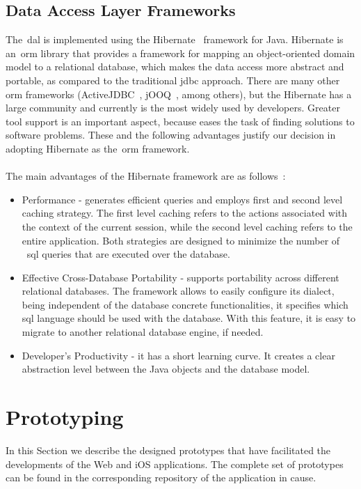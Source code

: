 \subsection{Data Access Layer Frameworks}
The~\gls{dal} is implemented using the Hibernate~\cite{hibernate} framework for Java. Hibernate is an~\gls{orm} library that provides a framework for mapping an object-oriented domain model to a relational database, which makes the data access more abstract and portable, as compared to the traditional \gls{jdbc} approach. There are many other \gls{orm} frameworks (ActiveJDBC~\cite{activeJDBC}, jOOQ~\cite{jooq}, among others), but the Hibernate has a large community and currently is the most widely used by developers. Greater tool support is an important aspect, because eases the task of finding solutions to software problems. These and the following advantages justify our decision in adopting Hibernate as the~\gls{orm} framework.\\
\\
The main advantages of the Hibernate framework are as follows~\cite{hibernateBenefits}:
\begin{itemize}
\item Performance - generates efficient queries and employs first and second level caching strategy. The first level caching refers to the actions associated with the context of the current session, while the second level caching refers to the entire application. Both strategies are designed to minimize the number of ~\gls{sql} queries that are executed over the database.
\item Effective Cross-Database Portability - supports portability across different relational databases. The framework allows to easily configure its dialect, being independent of the database concrete functionalities, it specifies which \gls{sql} language should be used with the database. With this feature, it is easy to migrate to another relational database engine, if needed. 
\item Developer's Productivity - it has a short learning curve. It creates a clear abstraction level between the Java objects and the database model.
\end{itemize}


\section{Prototyping}
\label{sec:prototyping}
In this Section we describe the designed prototypes that have facilitated the developments of the Web and iOS applications. The complete set of prototypes can be found in the corresponding repository of the application in cause.
